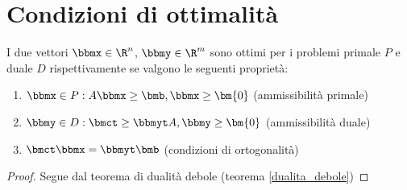 \documentclass[\main/main.tex]{subfiles}
\begin{document}
\section{Condizioni di ottimalità}
\begin{theorem}
  I due vettori $\bbmx \in \R^n$,  $\bbmy \in \R^m$ sono ottimi per i problemi primale $P$ e duale $D$ rispettivamente se valgono le seguenti proprietà:
  \begin{enumerate}
    \item $\bbmx \in P: A\bbmx \geq \bmb, \bbmx \geq \bm{0}$ (ammissibilità primale)
    \item $\bbmy \in D: \bmct \geq \bbmyt A, \bbmy \geq \bm{0}$ (ammissibilità duale)
    \item $\bmct \bbmx = \bbmyt \bmb$ (condizioni di ortogonalità)
  \end{enumerate}
\end{theorem}

\begin{proof}
  Segue dal teorema di dualità debole (teorema \ref{dualita_debole})
\end{proof}
\end{document}
